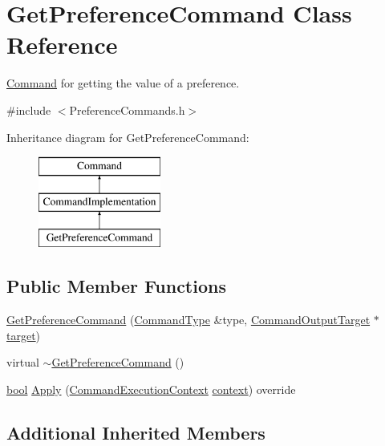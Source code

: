 \hypertarget{class_get_preference_command}{}\section{Get\+Preference\+Command Class Reference}
\label{class_get_preference_command}


\hyperlink{class_command}{Command} for getting the value of a preference.  




{\ttfamily \#include $<$Preference\+Commands.\+h$>$}

Inheritance diagram for Get\+Preference\+Command\+:\begin{figure}[H]
\begin{center}
\leavevmode
\includegraphics[height=3.000000cm]{class_get_preference_command}
\end{center}
\end{figure}
\subsection*{Public Member Functions}
\begin{DoxyCompactItemize}
\item 
\hyperlink{class_get_preference_command_a31f41486a71020209ea8bdaa2072abf1}{Get\+Preference\+Command} (\hyperlink{class_command_type}{Command\+Type} \&type, \hyperlink{class_command_output_target}{Command\+Output\+Target} $\ast$\hyperlink{lib_2expat_8h_a15a257516a87decb971420e718853137}{target})
\item 
virtual \hyperlink{class_get_preference_command_aacd7470da14146b5540d64cdbd4ae8a5}{$\sim$\+Get\+Preference\+Command} ()
\item 
\hyperlink{mac_2config_2i386_2lib-src_2libsoxr_2soxr-config_8h_abb452686968e48b67397da5f97445f5b}{bool} \hyperlink{class_get_preference_command_acd36978c5401c0b4f23b7c469808b0fd}{Apply} (\hyperlink{class_command_execution_context}{Command\+Execution\+Context} \hyperlink{structcontext}{context}) override
\end{DoxyCompactItemize}
\subsection*{Additional Inherited Members}


